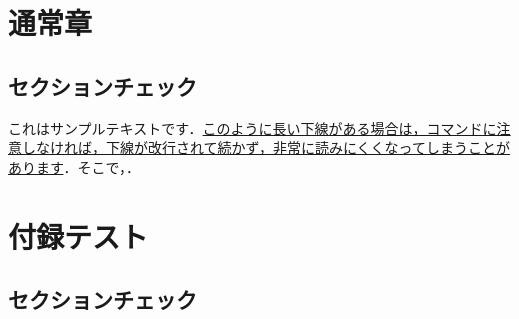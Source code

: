 \documentclass[11pt,a4paper,openright]{ltjsbook}
\begin{document}
\tableofcontents

\chapter{通常章}

\lipsum

\section{セクションチェック}

これはサンプルテキストです．\uline{このように長い下線がある場合は，コマンドに注意しなければ，下線が改行されて続かず，非常に読みにくくなってしまうことがあります}．そこで，．

\lipsum

\lipsum

\appendix
\chapter{付録テスト}

\lipsum

\section{セクションチェック}

\lipsum

\lipsum
\end{document}
